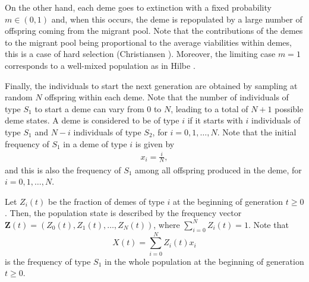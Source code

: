 \documentclass[11pt]{article}
\begin{document}
%

On the other hand, each deme goes to extinction with a fixed probability $m\in (0, 1)$ and, when this occurs, the deme is repopulated by a large number of offspring coming from the migrant pool. Note that the contributions of the demes to the migrant pool being proportional to the average viabilities within demes, this is a case of hard selection (Christiansen \cite{C1975}). Moreover, the limiting case $m=1$ corresponds to a well-mixed population as in Hilbe \cite{H2011}.

Finally, the individuals to start the next generation are obtained by sampling at random $N$ offspring within each deme.
Note that the number of individuals of type $S_1$ to start a deme can vary from $0$ to $N$, leading to a total of $N+1$ possible deme states. A deme is considered to be of type $i$ if it starts with $i$ individuals of type $S_1$ and $N-i$ individuals of type $S_2$, for $i=0,1,\ldots,N$. Note that the initial frequency of $S_1$ in a deme of type $i$ is given by
\begin{align}
x_i=\frac{i}{N},
\end{align}
and this is also the frequency of $S_1$ among all offspring produced in the deme, for $i=0,1,\ldots,N$.

Let $Z_i(t)$ be the fraction of demes of type $i$ at the beginning of generation $t\geq0$. Then, the population state is described by the frequency vector $\mathbf{Z}(t)=(Z_0(t),Z_1(t),\ldots,Z_N(t))$, where $\sum_{i=0}^{N}Z_i(t)=1$.
Note that
\begin{equation}\label{sec1-eq6}
X(t)=\sum_{i=0}^{N}Z_i(t)x_i
\end{equation}
is the frequency of type $S_1$ in the whole population at the beginning of generation $t\geq0$. 
\end{document}
